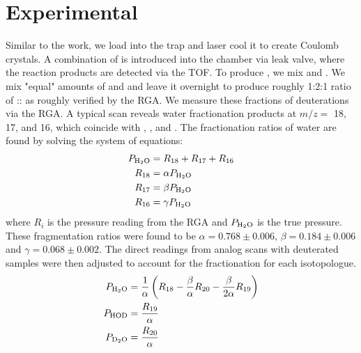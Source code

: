 \section{Experimental}

Similar to the  work, we load  into the trap and laser cool it to create Coulomb crystals. A combination of  is introduced into the chamber via leak valve, where the reaction products are detected via the TOF. To produce , we mix  and .\cite{Pyper1967,Harich2001} We mix "equal" amounts of  and  and leave it overnight to produce roughly 1:2:1 ratio of :: as roughly verified by the RGA. We measure these fractions of deuterations via the RGA. A typical scan reveals water fractionation products at $m/z =$ 18, 17, and 16, which coincide with , , and . The fractionation ratios of water are found by solving the system of equations:
\begin{align}
	P_{\ce{H2O}} & = R_{18} + R_{17} + R_{16} \\
	R_{18} & = \alpha P_{\ce{H2O}} \\
	R_{17} & = \beta P_{\ce{H2O}} \\
	R_{16} & = \gamma P_{\ce{H2O}}
\end{align}
where $R_i$ is the pressure reading from the RGA and $P_{\ce{H2O}}$ is the true  pressure. These fragmentation ratios were found to be $\alpha = 0.768 \pm 0.006$, $\beta = 0.184 \pm 0.006$ and $\gamma = 0.068 \pm 0.002$. The direct readings from analog scans with deuterated samples were then adjusted to account for the fractionation for each isotopologue.
\begin{align}
	P_{\ce{H2O}} & = \frac{1}{\alpha}\left(R_{18} - \frac{\beta}{\alpha}R_{20} - \frac{\beta}{2\alpha} R_{19}\right) \\
	P_{\ce{HOD}} & = \frac{R_{19}}{\alpha} \\
	P_{\ce{D2O}} & = \frac{R_{20}}{\alpha}
\end{align}

